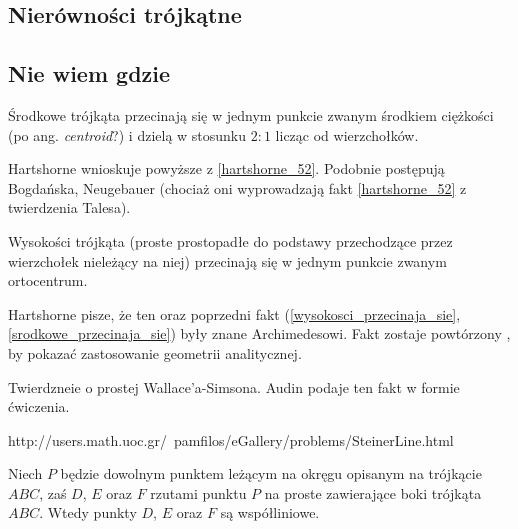 
\subsection{Nierówności trójkątne}


\subsection{Nie wiem gdzie}

\begin{proposition}
	\label{srodkowe_przecinaja_sie}
	Środkowe trójkąta przecinają się w jednym punkcie zwanym środkiem ciężkości (po ang. \emph{centroid}?) i dzielą w stosunku $2 : 1$ licząc od wierzchołków.
\end{proposition}

Hartshorne \cite[s. 53, 54]{hartshorne2000} wnioskuje powyższe z \ref{hartshorne_52}.
Podobnie postępują Bogdańska, Neugebauer (chociaż oni wyprowadzają fakt \ref{hartshorne_52} z twierdzenia Talesa).
%

\begin{proposition}
	\label{wysokosci_przecinaja_sie}
	Wysokości trójkąta (proste prostopadłe do podstawy przechodzące przez wierzchołek nieleżący na niej) przecinają się w jednym punkcie zwanym ortocentrum.
\end{proposition}

Hartshorne \cite[s. 52, 54]{hartshorne2000} pisze, że ten oraz poprzedni fakt (\ref{wysokosci_przecinaja_sie}, \ref{srodkowe_przecinaja_sie}) były znane Archimedesowi.
Fakt zostaje powtórzony \cite[s. 119-120]{hartshorne2000}, by pokazać zastosowanie geometrii analitycznej.

Twierdzneie o prostej Wallace'a-Simsona. %
Audin \cite[s. 104]{audin_2003} podaje ten fakt w formie ćwiczenia.

http://users.math.uoc.gr/~pamfilos/eGallery/problems/SteinerLine.html

\begin{proposition}
	Niech $P$ będzie dowolnym punktem leżącym na okręgu opisanym na trójkącie $ABC$, zaś $D$, $E$ oraz $F$ rzutami punktu $P$ na proste zawierające boki trójkąta $ABC$.
	Wtedy punkty $D$, $E$ oraz $F$ są współliniowe.
\end{proposition}

